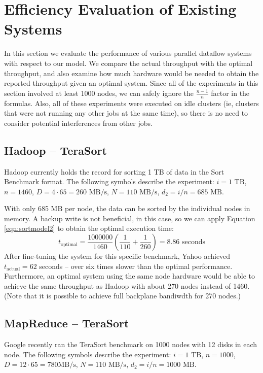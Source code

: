 \documentclass{acm_proc_article-sp}
\begin{document}
\section{Efficiency Evaluation of Existing Systems}

In this section we evaluate the performance of various parallel dataflow
systems with respect to our model. We compare the actual throughput with the
optimal throughput, and also examine how much hardware would be needed
to obtain the reported throughput given an optimal system. Since all of the
experiments in this section involved at least 1000 nodes, we can safely ignore
the $\frac{n-1}{n}$ factor in the formulas. Also, all of these experiments
were executed on idle clusters (ie, clusters that were not running any other
jobs at the same time), so there is no need to consider potential interferences
from other jobs.

\subsection{Hadoop -- TeraSort}

Hadoop currently holds the record \cite{hadoop2009} for sorting 1 TB of data in
the Sort Benchmark \cite{sortbenchmark} format. The following symbols describe
the experiment: $i = 1 \text{ TB}$, $n = 1460$, $D = 4 \cdot 65 = 260 \text{ MB/s}$, $N = 110 \text{ MB/s}$, $d_2 = i/n = 685 \text{ MB}$.

With only 685 MB per node, the data can be sorted by the individual nodes in memory. A backup write is not beneficial, in this case, so we can apply Equation \ref{eqn:sortmodel2} to obtain the optimal execution time:
\[t_\text{optimal} = \frac{1000000}{1460} \left( \frac{1}{110} + \frac{1}{260}
\right) = 8.86 \text{ seconds}\]
After fine-tuning the system for this specific
benchmark, Yahoo achieved $t_\text{actual} = 62$ seconds -- over six times
slower than the optimal performance. Furthermore, an optimal system using
the same node hardware would be able to achieve the same throughput as Hadoop
with about 270 nodes instead of 1460. (Note that it is possible to achieve full
backplane bandiwdth for 270 nodes.)

\subsection{MapReduce -- TeraSort}

Google recently ran \cite{sorting1pb} the TeraSort benchmark on 1000 nodes with
12 disks in each node. The following symbols describe the experiment: $i = 1 \text{ TB}$, $n = 1000$, $D = 12 \cdot 65 = 780 \text{
MB/s}$, $N = 110 \text{ MB/s}$, $d_2 = i/n = 1000 \text{ MB}$.
\end{document}
